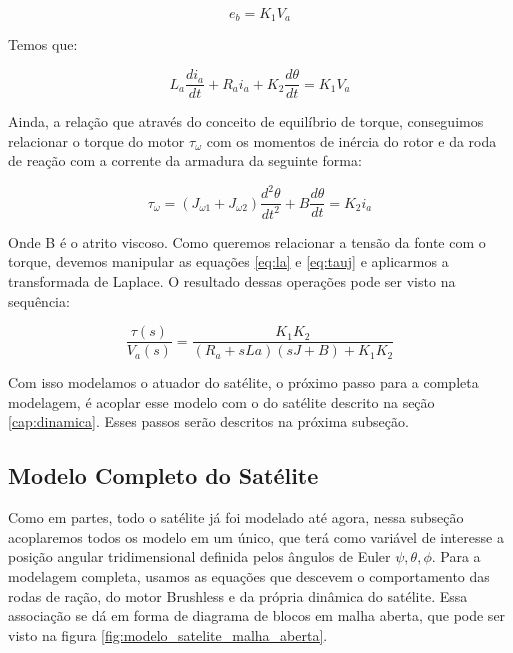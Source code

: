 \begin{equation}
  e_b = K_1V_a
\end{equation}

Temos que:

\begin{equation}\label{eq:la}
L_a \frac{di_a}{dt}+R_a i_a + K_2\frac{d\theta}{dt} = K_1V_a
\end{equation}

Ainda, a relação que através do conceito de equilíbrio de torque, conseguimos relacionar o torque do motor $\tau_{\omega}$ com os momentos de inércia do rotor e da roda de reação com a corrente da armadura da seguinte forma:

\begin{equation}\label{eq:tauj}
\tau_{\omega} = (J_{\omega 1} + J_{\omega 2})\frac{d^{2}\theta}{dt^{2}}+B\frac{d\theta}{dt} = K_2 i_a
\end{equation}

Onde B é o atrito viscoso. Como queremos relacionar a tensão da fonte com o torque, devemos manipular as equações \ref{eq:la} e \ref{eq:tauj} e aplicarmos a transformada de Laplace. O resultado dessas operações pode ser visto na sequência: 

\begin{equation}
  \frac{\tau(s)}{V_a(s)} = \frac{K_1K_2}{(R_a+ sLa)(sJ+B)+K_1K_2}  
\end{equation}

Com isso modelamos o atuador do satélite, o próximo passo para a completa modelagem, é acoplar esse modelo com o do satélite descrito na seção \ref{cap:dinamica}. Esses passos serão descritos na próxima subseção.

\subsection{Modelo Completo do Satélite}

Como em partes, todo o satélite já foi modelado até agora, nessa subseção acoplaremos todos os modelo em um único, que terá como variável de interesse a posição angular tridimensional definida pelos ângulos de Euler $\psi, \theta, \phi$. Para a modelagem completa, usamos as equações que descevem o comportamento das rodas de ração, do motor Brushless e da própria dinâmica do satélite. Essa associação se dá em forma de diagrama de blocos em malha aberta, que pode ser visto na figura \ref{fig:modelo_satelite_malha_aberta}.


